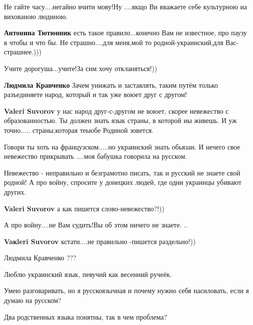 \begin{itemize}
\begin{itemize}
Не гайте часу....негайно вчити мову!Ну ....якщо Ви вважаете себе культурною иа вихованою людиною.

\textbf{Антонина Тютюнник} есть такое правило...конечно Вам не известное, про
паузу в чтобы и что бы. Не страшно....для меня,мой то родной-украинский,для
Вас-страшнее.)))

Учите дорогуша...учите!За сим хочу откланяться!))

\textbf{Людмила Кравченко} Зачем унижать и заставлять,
таким путём только разъединяете народ, который и так уже воюет друг с другом!


\textbf{Valeri Suvorov} у нас народ друг-с-другом не воюет, скорее невежество с
образованностью. Ты должен знать язык страны, в которой иы живешь. И уж
точно..... страны,которая теьюбе Родиной зовется.


Говори ты хоть на французском.....но украинский знать обьязан. И нечего свое
невежество прикрывать ....моя бабушка говорила на русском.


Невежество - неправильно и безграмотно писать, так и русский не знаете свой
родной! А про войну, спросите у донецких людей, где одни украинцы убивают
других.

\textbf{Valeri Suvorov} а как пишется слово-невежество?!))

А про войну....не Вам судить!Вы об этом ничего не знаете. ..

\textbf{Vaкleri Suvorov} кстати....не правильно -пишется раздельно!))

Людмила Кравченко ???
\end{itemize}


Люблю украинский язык, певучий как весенний ручеёк.

Умею разговаривать, но я русскоязычная и почему нужно себя насиловать, если я
думаю на русском?

Два родственных языка понятны, так в чем проблема?



\end{itemize}
